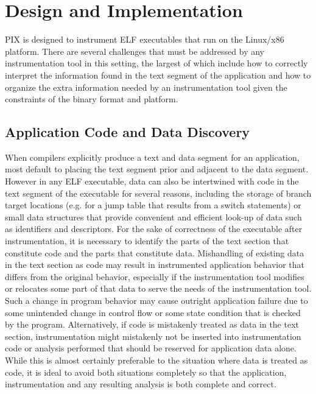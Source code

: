 \section{Design and Implementation}
\label{sec:Overview}

PIX is designed to instrument ELF executables that run on the Linux/x86 platform.
There are several challenges that must be
addressed by any instrumentation tool in this setting, the largest of which include how to correctly
interpret the information found in the text segment of the application and how to organize the
extra information needed by an instrumentation tool given the constraints of the binary format
and platform.

\subsection{Application Code and Data Discovery}
When compilers explicitly produce a text and data segment for an application,
most default to placing the text segment prior and adjacent to the data segment.
However in any ELF executable, data can also be intertwined with code in the text segment of the executable for several reasons, including
the storage of branch target locations (e.g. for a jump table that results from a switch statements) or small data structures 
that provide convenient and efficient look-up of data such as identifiers and descriptors. 
For the sake of correctness of the executable after instrumentation, it is necessary to identify the parts of the text 
section that constitute code and the parts that constitute data. Mishandling of existing data in the text section as code 
may result in instrumented application behavior that differs from the original behavior, especially 
if the instrumentation tool modifies or relocates some part of that data 
to serve the needs of the instrumentation tool. 
Such a change in program behavior may cause outright application failure due to some unintended change in control flow 
or some state condition that is checked by the program.
Alternatively, if code is mistakenly treated as data in the text section, instrumentation might
mistakenly not be inserted into instrumentation code or analysis performed that should be reserved for
application data alone. While this is almost certainly preferable to the situation where data is treated as code, it
is ideal to avoid both situations completely so that the application, 
instrumentation and any resulting analysis is both complete and correct.


